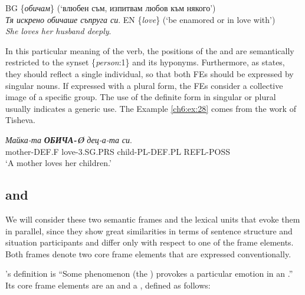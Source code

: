 \documentclass[output=paper,colorlinks,citecolor=brown]{langscibook}
\begin{document}
\begin{exe} 
\ex   \label{ch6:ex:27}
\begin{xlist}
\ex  \label{ch6:ex:27a} %
BG \{\textit{обичам}\} (`влюбен съм, изпитвам любов към някого’) \\
\textit{Тя искрено обичаше съпруга си}. 
\ex  \label{ch6:ex:27b}%
EN \{\textit{love}\} (`be enamored or in love with’)\\
\textit{She loves her husband deeply}.
\end{xlist}
\end{exe}

In this particular meaning of the verb, the positions of the and  are semantically restricted to the synset \{\textit{person}:1\} and its hyponyms. Furthermore, as \citet [124]{tisheva2021наблюдения} states, they should reflect a single individual, so that both FEs should be expressed by singular nouns. If expressed with a plural form, the FEs consider a collective image of a specific group. The use of the definite form in singular or plural usually indicates a generic use. The Example \ref{ch6:ex:28} comes from the work of Tisheva.
 
\begin{exe} 
\ex   \label{ch6:ex:28}
\gll \textit{Майка-та} {\textit{\textbf{ОБИЧА-Ø}}} {\textit{дец-а-та}} {\textit{си}}.\\ 
{mother-DEF.F} {love-3.SG.PRS} {child-PL-DEF.PL} {REFL-POSS}
\\  %
\glt `A mother loves her children.'
\end{exe}


\subsection{ and }\label{ch6:sec:stemcaex}

We will consider these two semantic frames and the lexical units that evoke them in parallel, since they show great similarities in terms of sentence structure and situation participants and differ only with respect to one of the frame elements. Both frames denote two core frame elements that are expressed conventionally.

’s definition is ``Some phenomenon (the ) provokes a particular emotion in an .'' Its core frame elements are an  and a , defined as follows:
\end{document}
